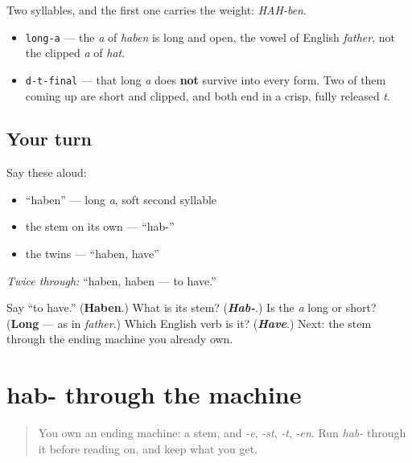 Two syllables, and the first one carries the weight: \emph{HAH-ben}.

\begin{sounds}
\begin{itemize}
\raggedright
  \item \texttt{long-a} — the \emph{a} of \emph{haben} is long and open, the vowel of English \emph{father}, not the clipped \emph{a} of \emph{hat}.
  \item \texttt{d-t-final} — that long \emph{a} does \textbf{not} survive into every form. Two of them coming up are short and clipped, and both end in a crisp, fully released \emph{t}.
\end{itemize}
\end{sounds}

\subsection*{Your turn}
Say these aloud:

\begin{itemize}
\raggedright
  \item \textquotedblleft{}haben\textquotedblright{} — long \emph{a}, soft second syllable
  \item the stem on its own — \textquotedblleft{}hab-\textquotedblright{}
  \item the twins — \textquotedblleft{}haben, have\textquotedblright{}
\end{itemize}

\emph{Twice through:} \textquotedblleft{}haben, haben — to have.\textquotedblright{}

\begin{tcolorbox}[breakable,colback=teal!4,colframe=teal!35!black,title={Before you move on}]
Say \textquotedblleft{}to have.\textquotedblright{} (\textbf{Haben}.) What is its stem? (\emph{\textbf{Hab-}}.) Is the \emph{a} long or short? (\textbf{Long} — as in \emph{father}.) Which English verb is it? (\emph{\textbf{Have}}.) Next: the stem through the ending machine you already own.
\end{tcolorbox}
\section[ich habe, wir haben, ihr habt]{hab- through the machine}

\label{lesson:GE-C14-hab-stamm}



\begin{quote}
You own an ending machine: a stem, and \emph{-e}, \emph{-st}, \emph{-t}, \emph{-en}. Run \emph{hab-} through it before reading on, and keep what you get.
\end{quote}

